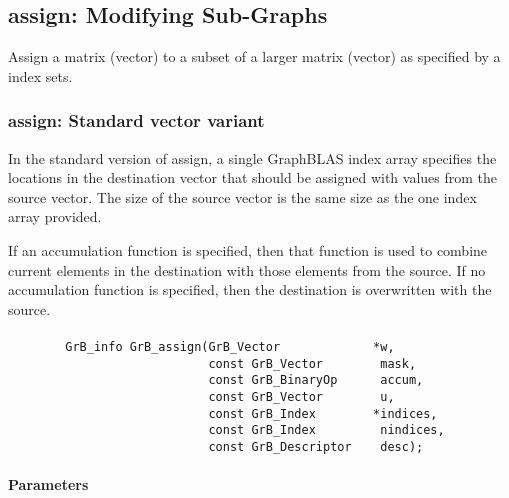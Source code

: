 \subsection{{\sf assign}: Modifying Sub-Graphs}
\label{Sec:assign}

Assign a matrix (vector) to a subset  of a larger matrix (vector) as specified by a index sets.



\subsubsection{{\sf assign}: Standard vector variant}

In the standard version of {\sf assign}, a single GraphBLAS index array specifies
the locations in the destination vector that should be assigned with values
from the source vector.  The size of the source vector is the same size as the one
index array provided.

If an accumulation function is specified, then that function is used
to combine current elements in the destination with those elements
from the source.  If no accumulation function is specified, then the
destination is overwritten with the source.


\paragraph{\syntax}

\begin{verbatim}
        GrB_info GrB_assign(GrB_Vector             *w,
                            const GrB_Vector        mask,
                            const GrB_BinaryOp      accum,
                            const GrB_Vector        u,
                            const GrB_Index        *indices,
                            const GrB_Index         nindices,
                            const GrB_Descriptor    desc);
\end{verbatim}

\paragraph{Parameters}

